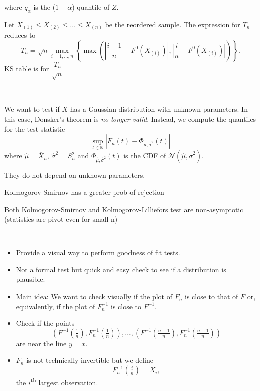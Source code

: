 \documentclass[a4paper, 10pt,landscape]{article}
\begin{document}
\begin{multicols*}{3}
\begin{description}
\begin{description}
				where $q_\alpha$ is the ($1-\alpha$)-quantile of $Z$.
				\item Let $X_{(1)}\leq X_{(2)}\leq\dots\leq X_{(n)}$ be the reordered sample. The expression for $T_n$ reduces to
				$$T_n=\sqrt{n}\max\limits_{i=1,\dots,n}\left\{\max\left(\left|\dfrac{i-1}{n}-F^0\left(X_{(i)}\right)\right|,\left|\dfrac{i}{n}-F^0\left(X_{(i)}\right)\right|\right)\right\}.$$
				KS table is for $\dfrac{T_n}{\sqrt{n}}$
			\end{description}	
		\item[Kolmogorov-Lilliefors Test]~
			\begin{description}		
				\item We want to test if $X$ has a Gaussian distribution with unknown parameters. In this case, Donsker's theorem is {\it no longer valid}. Instead, we compute the quantiles for the test statistic
				$$\sup\limits_{t\in\mathbb{R}}\left|F_n(t)-\Phi_{\hat{\mu},\hat{\sigma}^2}(t)\right|$$
				where $\hat{\mu}=\overline{X}_n$, $\hat{\sigma}^2=S_n^2$ and $\Phi_{\hat{\mu},\hat{\sigma}^2}(t)$ is the CDF of $\mathcal{N}\left(\hat{\mu},\hat{\sigma}^2\right).$
				\item They do not depend on unknown parameters.
				\item Kolmogorov-Smirnov has a greater prob of rejection
				\item Both Kolmogorov-Smirnov and Kolmogorov-Lilliefors test are non-asymptotic (statistics are pivot even for small n)
			\end{description}
		\item[QQ plot]~
			\begin{itemize}
				\item Provide a visual way to perform goodness of fit tests.
				\item Not a formal test but quick and easy check to see if a distribution is plausible.
				\item Main idea: We want to check visually if the plot of $F_n$ is close to that of $F$ or, equivalently, if the plot of $F_n^{-1}$ is close to $F^{-1}$.
				\item Check if the points
				$$\left(F^{-1}(\tfrac{1}{n}),F_n^{-1}(\tfrac{1}{n})\right),\dots,\left(F^{-1}(\tfrac{n-1}{n}),F_n^{-1}(\tfrac{n-1}{n})\right)$$
				are near the line $y=x.$
				\item $F_n$ is not technically invertible but we define
				$$F_n^{-1}(\tfrac{i}{n})=X_i,$$
				the $i$\textsuperscript{th} largest observation.
			\end{itemize}
			
	\end{description}





\end{multicols*}
\end{document}
